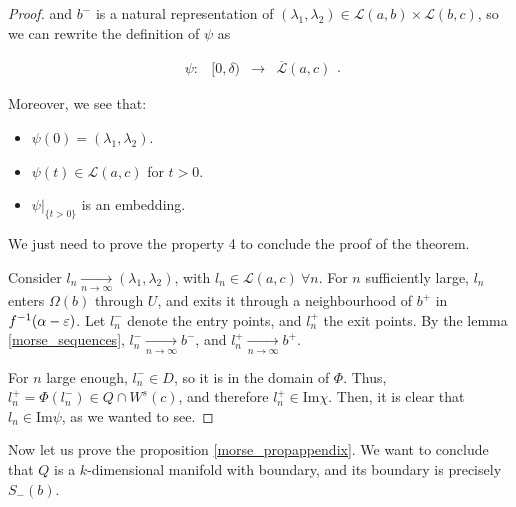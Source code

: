 \begin{proof}
and $b^-$ is a natural representation of $(\lambda_1,\lambda_2) \in \mathcal{L}(a,b) \times \mathcal{L}(b,c)$, so we can rewrite the definition of $\psi$ as

$$\begin{array}{rccc} \psi : & [0,\delta) & \longrightarrow & \overline{\mathcal{L}}(a,c) \end{array} .$$

Moreover, we see that:

\begin{itemize}
	\item $\psi(0) = (\lambda_1,\lambda_2)$.
	\item $\psi(t) \in \mathcal{L}(a,c)$ for $t > 0$.
	\item $\left. \psi \right|_{\{t > 0\}}$ is an embedding.
\end{itemize}

We just need to prove the property 4 to conclude the proof of the theorem.

Consider $l_n \xrightarrow[n \rightarrow \infty]{} (\lambda_1,\lambda_2)$, with $l_n \in \mathcal{L}(a,c) \ \forall n$. For $n$ sufficiently large, $l_n$ enters $\Omega(b)$ through $U$, and exits it through a neighbourhood of $b^+$ in $f^{-1}(\alpha-\varepsilon)$. Let $l_n^-$ denote the entry points, and $l_n^+$ the exit points. By the lemma \ref{morse_sequences}, $l_n^- \xrightarrow[n \rightarrow \infty]{} b^-$, and $l_n^+ \xrightarrow[n \rightarrow \infty]{} b^+$.

For $n$ large enough, $l_n^- \in D$, so it is in the domain of $\Phi$. Thus, $l_n^+ = \Phi(l_n^-) \in Q \cap W^s(c)$, and therefore $l_n^+ \in \text{Im} \chi$. Then, it is clear that $l_n \in \text{Im} \psi$, as we wanted to see.
\end{proof}

Now let us prove the proposition \ref{morse_propappendix}. We want to conclude that $Q$ is a $k$-dimensional manifold with boundary, and its boundary is precisely $S_-(b)$.


